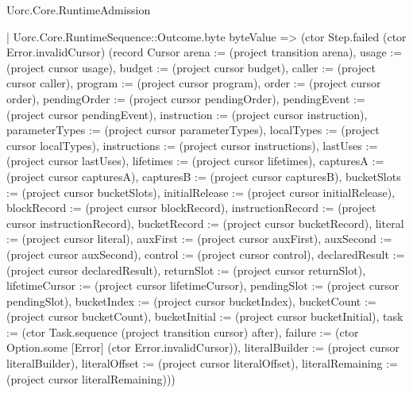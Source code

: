 \begin{lexlean}{Uorc.Core.RuntimeAdmission}
\begin{semanticmodule}
{        | Uorc.Core.RuntimeSequence::Outcome.byte byteValue => (ctor Step.failed (ctor Error.invalidCursor) (record Cursor {arena := (project transition arena), usage := (project cursor usage), budget := (project cursor budget), caller := (project cursor caller), program := (project cursor program), order := (project cursor order), pendingOrder := (project cursor pendingOrder), pendingEvent := (project cursor pendingEvent), instruction := (project cursor instruction), parameterTypes := (project cursor parameterTypes), localTypes := (project cursor localTypes), instructions := (project cursor instructions), lastUses := (project cursor lastUses), lifetimes := (project cursor lifetimes), capturesA := (project cursor capturesA), capturesB := (project cursor capturesB), bucketSlots := (project cursor bucketSlots), initialRelease := (project cursor initialRelease), blockRecord := (project cursor blockRecord), instructionRecord := (project cursor instructionRecord), bucketRecord := (project cursor bucketRecord), literal := (project cursor literal), auxFirst := (project cursor auxFirst), auxSecond := (project cursor auxSecond), control := (project cursor control), declaredResult := (project cursor declaredResult), returnSlot := (project cursor returnSlot), lifetimeCursor := (project cursor lifetimeCursor), pendingSlot := (project cursor pendingSlot), bucketIndex := (project cursor bucketIndex), bucketCount := (project cursor bucketCount), bucketInitial := (project cursor bucketInitial), task := (ctor Task.sequence (project transition cursor) after), failure := (ctor Option.some [Error] (ctor Error.invalidCursor)), literalBuilder := (project cursor literalBuilder), literalOffset := (project cursor literalOffset), literalRemaining := (project cursor literalRemaining)}))
}
\end{semanticmodule}
\end{lexlean}
